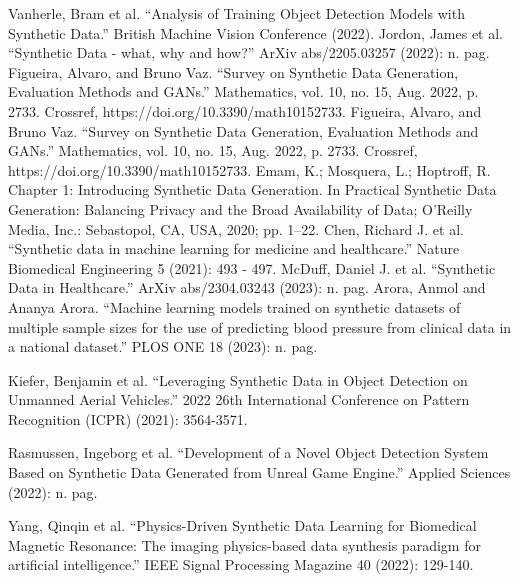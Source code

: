 \documentclass[preprint,12pt,authoryear]{elsarticle}
\begin{document}
\begin{thebibliography}{00}
Vanherle, Bram et al. “Analysis of Training Object Detection Models with Synthetic Data.” British Machine Vision Conference (2022).
Jordon, James et al. “Synthetic Data - what, why and how?” ArXiv abs/2205.03257 (2022): n. pag.
Figueira, Alvaro, and Bruno Vaz. “Survey on Synthetic Data Generation, Evaluation Methods and GANs.” Mathematics, vol. 10, no. 15, Aug. 2022, p. 2733. Crossref, https://doi.org/10.3390/math10152733.
Figueira, Alvaro, and Bruno Vaz. “Survey on Synthetic Data Generation, Evaluation Methods and GANs.” Mathematics, vol. 10, no. 15, Aug. 2022, p. 2733. Crossref, https://doi.org/10.3390/math10152733.
Emam, K.; Mosquera, L.; Hoptroff, R. Chapter 1: Introducing Synthetic Data Generation. In Practical Synthetic Data Generation:
Balancing Privacy and the Broad Availability of Data; O’Reilly Media, Inc.: Sebastopol, CA, USA, 2020; pp. 1–22.
Chen, Richard J. et al. “Synthetic data in machine learning for medicine and healthcare.” Nature Biomedical Engineering 5 (2021): 493 - 497.
McDuff, Daniel J. et al. “Synthetic Data in Healthcare.” ArXiv abs/2304.03243 (2023): n. pag.
Arora, Anmol and Ananya Arora. “Machine learning models trained on synthetic datasets of multiple sample sizes for the use of predicting blood pressure from clinical data in a national dataset.” PLOS ONE 18 (2023): n. pag. %

Kiefer, Benjamin et al. “Leveraging Synthetic Data in Object Detection on Unmanned Aerial Vehicles.” 2022 26th International Conference on Pattern Recognition (ICPR) (2021): 3564-3571.

Rasmussen, Ingeborg et al. “Development of a Novel Object Detection System Based on Synthetic Data Generated from Unreal Game Engine.” Applied Sciences (2022): n. pag.

Yang, Qinqin et al. “Physics-Driven Synthetic Data Learning for Biomedical Magnetic Resonance: The imaging physics-based data synthesis paradigm for artificial intelligence.” IEEE Signal Processing Magazine 40 (2022): 129-140.


\end{thebibliography}
\end{document}
